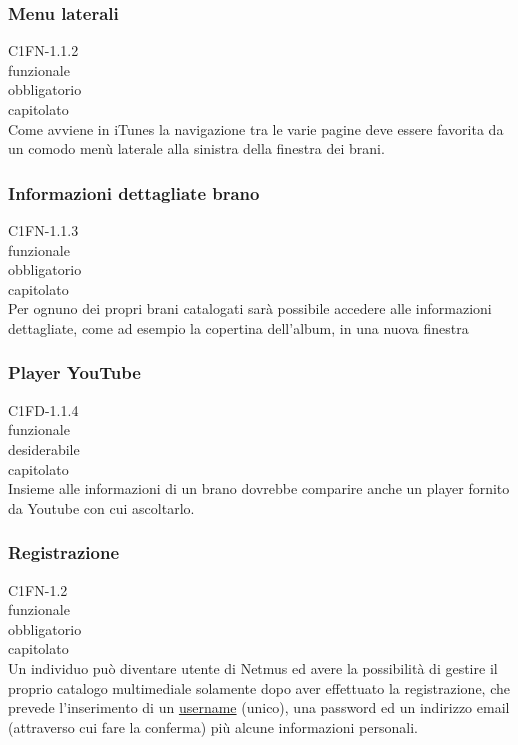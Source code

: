 \subsubsection*{Menu laterali}
 C1FN-1.1.2 \\
 funzionale \\
 obbligatorio \\
 capitolato \\
Come avviene in iTunes la navigazione tra le varie pagine deve essere favorita
da un comodo men\`u laterale alla sinistra della finestra dei brani.

\subsubsection*{Informazioni dettagliate brano}
 C1FN-1.1.3 \\
 funzionale \\
 obbligatorio \\
 capitolato \\
Per ognuno dei propri brani catalogati sar\`a possibile accedere alle informazioni
dettagliate, come ad esempio la copertina dell'album, in una nuova finestra

\subsubsection*{Player YouTube}
 C1FD-1.1.4 \\
 funzionale \\
 desiderabile \\
 capitolato \\
Insieme alle informazioni di un brano dovrebbe comparire anche un player fornito
da Youtube con cui ascoltarlo.

\subsubsection*{Registrazione}
 C1FN-1.2 \\
 funzionale \\
 obbligatorio \\
 capitolato \\
Un individuo pu\`o diventare utente di Netmus ed avere la possibilit\`a di gestire
il proprio catalogo multimediale solamente dopo aver effettuato la
registrazione, che prevede l'inserimento di un \underline{username} (unico), una
password ed un indirizzo email (attraverso cui fare la conferma) pi\`u alcune
informazioni personali.

